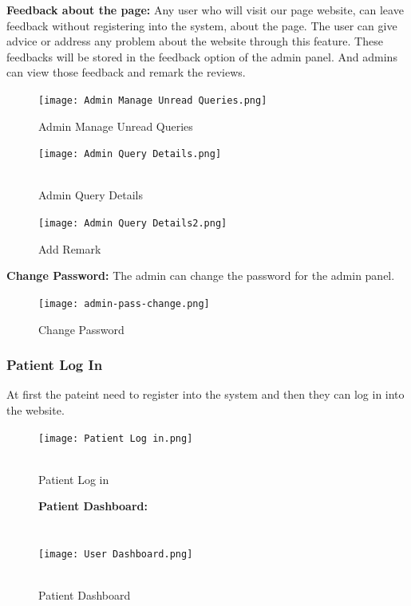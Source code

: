 \documentclass[14pt,a4paper,calibribody]{article}
\begin{document}
\textbf{Feedback about the page:} Any user who will visit our page website, can leave feedback without registering into the system, about the page. The user can give advice or address any problem about the website through this feature. These feedbacks will be stored in the feedback option of the admin panel. And admins can view those feedback and remark the reviews.\\
\begin{figure}[h]
\texttt{[image: Admin Manage Unread Queries.png]}\\
\caption{Admin Manage Unread Queries}
\end{figure}
\begin{figure}[h]
\texttt{[image: Admin Query Details.png]}\\\\
\caption{Admin Query Details}
\end{figure}
\begin{figure}[h]
\texttt{[image: Admin Query Details2.png]}\\
\caption{Add Remark}
\end{figure}
\clearpage
\textbf{Change Password:} The admin can change the password for the admin panel.\\
\begin{figure}[h]
\texttt{[image: admin-pass-change.png]}\\
\caption{Change Password}
\end{figure}

\subsubsection{Patient Log In}
At first the pateint need to register into the system and then they can log in into the website. \\

\begin{figure}[h]
\texttt{[image: Patient Log in.png]}\\\\
\caption{Patient Log in}
\end{figure}
\clearpage
\begin{figure}[h]
\textbf{Patient Dashboard:} \\\\\\
\texttt{[image: User Dashboard.png]}\\\\
\caption{Patient Dashboard}
\end{figure}
\end{document}
